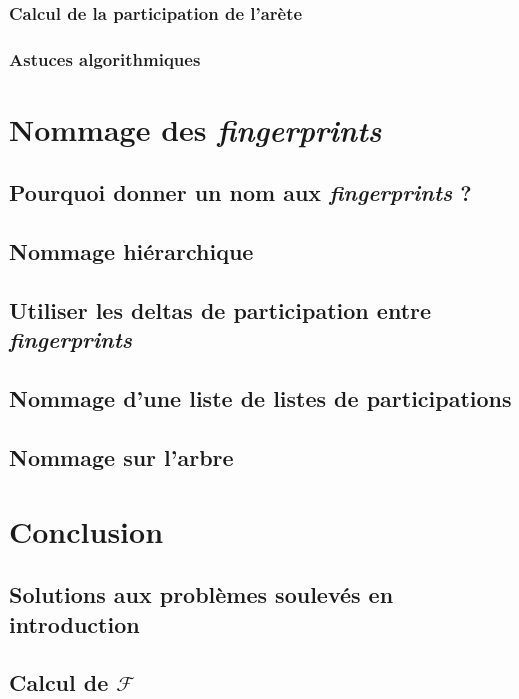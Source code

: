 \documentclass[a4paper]{article}
\begin{document}
\subsubsection{Calcul de la participation de l'arète}

\subsubsection{Astuces algorithmiques}

\section{Nommage des \textit{fingerprints}}

\subsection{Pourquoi donner un nom aux \textit{fingerprints} ?}

\subsection{Nommage hiérarchique}

\subsection{Utiliser les deltas de participation entre \textit{fingerprints}}

\subsection{Nommage d'une liste de listes de participations}

\subsection{Nommage sur l'arbre}

\section{Conclusion}

\subsection{Solutions aux problèmes soulevés en introduction}

\subsection{Calcul de $\mathcal{F}$}
\end{document}

